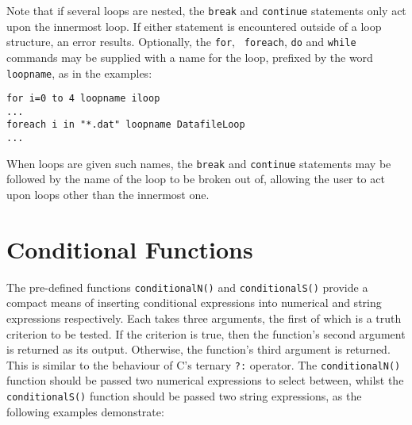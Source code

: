 Note that if several loops are nested, the {\tt break} and {\tt continue}
statements only act upon the innermost loop. If either statement is encountered
outside of a loop structure, an error results. Optionally, the {\tt for}, {\tt
foreach}, {\tt do} and {\tt while} commands may be supplied with a name for the
loop, prefixed by the word {\tt loopname}, as in the examples:

\begin{verbatim}
for i=0 to 4 loopname iloop
...
foreach i in "*.dat" loopname DatafileLoop
...
\end{verbatim}

\noindent When loops are given such names, the {\tt break} and {\tt continue}
statements may be followed by the name of the loop to be broken out of,
allowing the user to act upon loops other than the innermost one.

\section{Conditional Functions}

The pre-defined functions {\tt conditionalN()} and {\tt conditionalS()} provide
a compact means of inserting conditional expressions into numerical and string
expressions respectively.  Each takes three arguments, the first of which is a
truth criterion to be tested. If the criterion is true, then the function's
second argument is returned as its output. Otherwise, the function's third
argument is returned. This is similar to the behaviour of C's ternary {\tt ?:}
operator.  The {\tt conditionalN()} function should be passed two numerical
expressions to select between, whilst the {\tt conditionalS()} function should
be passed two string expressions, as the following examples demonstrate:

\vspace{2mm}
{\footnotesize
{}\newline
{}\newline
{}\newline
{}\newline
{}\newline
{}\newline
}

